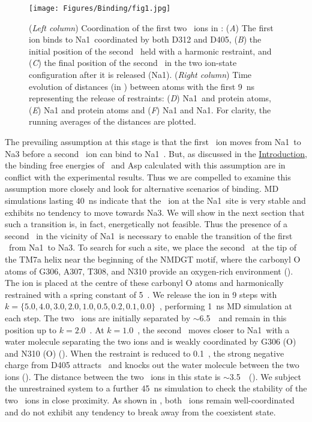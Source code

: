 \begin{figure}[t!]
\centering
\texttt{[image: Figures/Binding/fig1.jpg]}
\caption{(\textit{Left column}) Coordination of the first two \Na\ ions in \GltPh: 
         (\textit{A}) The first ion binds to Na1\prim\ coordinated by both D312 and 
         D405, (\textit{B}) the initial position of the second \Na\ held with a harmonic 
         restraint, and (\textit{C}) the final position of the second \Na\ in the two 
         ion-state configuration after it is released (Na1). (\textit{Right column}) Time 
         evolution of distances (in \angs) between atoms with the first 9~ns representing 
         the release of restraints: (\textit{D}) Na1\prim\ and protein atoms, (\textit{E}) 
         Na1 and protein atoms and (\textit{F}) Na1 and Na1\prim. For clarity, the 
         running averages of the distances are plotted.}
\label{bind:fig1}
\end{figure}

The prevailing assumption at this stage is that the first \Na\ ion moves from Na1\prim\ to Na3 
before a second \Na\ ion can bind to Na1~\cite{Huang2010,Bastug2012,Setiadi2015}. But, as discussed 
in the \hyperref[bind:intro]{Introduction}, the binding free energies of \Na\ and Asp calculated with 
this assumption are in conflict with the experimental results. Thus we are compelled to examine this 
assumption more closely and look for alternative scenarios of binding. MD simulations lasting 40~ns 
indicate that the \Na\ ion at the Na1\prim\ site is very stable and exhibits no tendency to move towards 
Na3. We will show in the next section that such a transition is, in fact, energetically not feasible. 
Thus the presence of a second \Na\ in the vicinity of Na1\prim\ is necessary to enable the transition 
of the first \Na\ from Na1\prim\ to Na3. To search for such a site, we place the second \Na\ at 
the tip of the TM7a helix near the beginning of the NMDGT motif, where the carbonyl O atoms of 
G306, A307, T308, and N310 provide an oxygen-rich environment (). The ion is 
placed at the centre of these carbonyl O atoms and harmonically restrained with a spring constant 
of 5~\spring. We release the ion in 9 steps with $k=\{5.0,4.0,3.0,2.0,1.0,0.5,0.2,0.1,0.0\}$~\spring, 
performing 1~ns MD simulation at each step. The two \Na\ ions are initially separated by $\sim$6.5~\angs\ 
and remain in this position up to $k=2.0$~\spring. At $k=1.0$~\spring, the second \Na\ moves closer 
to Na1\prim\ with a water molecule separating the two ions and is weakly coordinated by G306 (O) and 
N310 (O) (\figrefn{bind:fig1}{E--D}). When the restraint is reduced to 0.1~\spring, the strong negative 
charge from D405 attracts \Na\ and knocks out the water molecule between the two ions 
(\figrefi{bind:fig1}{C}). The distance between the two \Na\ ions in this state is $\sim$3.5~\angs\ 
(). We subject the unrestrained system to a further 45~ns simulation to check 
the stability of the two \Na\ ions in close proximity. As shown in \figrefn{bind:fig1}{D--F}, both \Na\ 
ions remain well-coordinated and do not exhibit any tendency to break away from the coexistent state.

